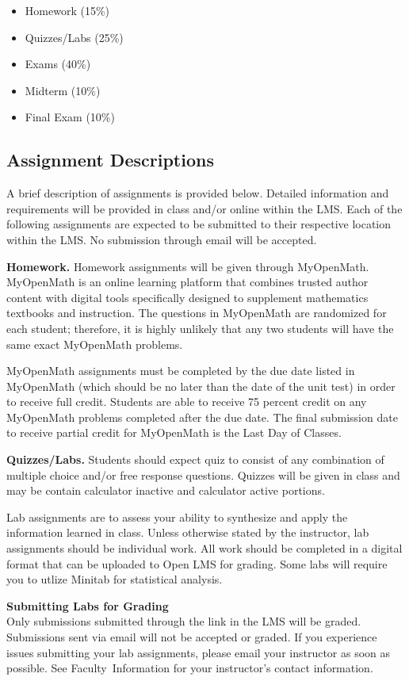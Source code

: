 \documentclass[11pt]{article}
\renewenvironment{framed}[1][]{%
  \def\FrameCommand{%
    \hspace{1pt}%
    {\color{mybordercolor}\vrule width 2pt} %
    \hspace{1pt}%
    \fboxsep=\FrameSep%
    \colorbox{mybgcolor}%
  }%
  \MakeFramed {\advance\hsize-\width \FrameRestore}%
}{%
  \endMakeFramed
}
\begin{document}
\begin{itemize}
\item Homework (15\%)
\item Quizzes/Labs (25\%)
\item Exams (40\%)
\item Midterm (10\%)
\item Final Exam (10\%)
\end{itemize}

\subsection{Assignment Descriptions}

A brief description of assignments is provided below. Detailed information and requirements will be provided in class and/or online within the LMS. Each of the following assignments are expected to be submitted to their respective location within the LMS. No submission through email will be accepted.

\textbf{Homework.} Homework assignments will be given through MyOpenMath. MyOpenMath is an online learning platform that combines trusted author content with digital tools specifically designed to supplement mathematics textbooks and instruction. The questions in MyOpenMath are randomized for each student; therefore, it is highly unlikely that any two students will have the same exact MyOpenMath problems.

MyOpenMath assignments must be completed by the due date listed in MyOpenMath (which should be no later than the date of the unit test) in order to receive full credit. Students are able to receive 75 percent credit on any MyOpenMath problems completed after the due date. The final submission date to receive partial credit for MyOpenMath is the Last Day of Classes.

\textbf{Quizzes/Labs.} Students should expect quiz to consist of any combination of multiple choice and/or free response questions. Quizzes will be given in class and may be contain calculator inactive and calculator active portions.

Lab assignments are to assess your ability to synthesize and apply the information learned in class. Unless otherwise stated by the instructor, lab assignments should be individual work. All work should be completed in a digital format that can be uploaded to Open LMS for grading. Some labs will require you to utlize Minitab for statistical analysis.

\begin{framed}
\textbf{Submitting Labs for Grading}\\
Only submissions submitted through the link in the LMS will be graded. Submissions sent via email will not be accepted or graded. If you experience issues submitting your lab assignments, please email your instructor as soon as possible. See Faculty~Information for your instructor's contact information.
\end{framed}
\end{document}
